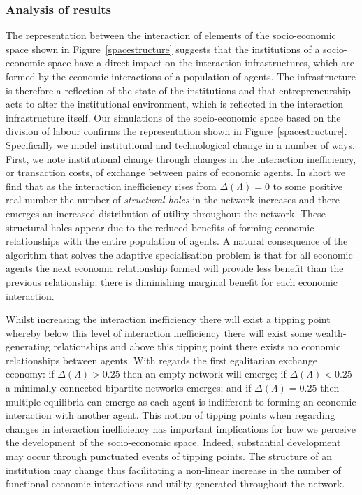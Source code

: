 \subsubsection{Analysis of results}
\label{sub:analysis_of_results}

The representation between the interaction of elements of the socio-economic space shown in Figure~\ref{spacestructure} suggests that the institutions of a socio-economic space have a direct impact on the interaction infrastructures, which are formed by the economic interactions of a population of agents. The infrastructure is therefore a reflection of the state of the institutions and that entrepreneurship acts to alter the institutional environment, which is reflected in the interaction infrastructure itself. Our simulations of the socio-economic space based on the division of labour confirms the representation shown in Figure~\ref{spacestructure}. Specifically we model institutional and technological change in a number of ways. First, we note institutional change through changes in the interaction inefficiency, or transaction costs, of exchange between pairs of economic agents. In short we find that as the interaction inefficiency rises from $\Delta(\Lambda) = 0$ to some positive real number the number of \emph{structural holes} in the network increases and there emerges an increased distribution of utility throughout the network. These structural holes appear due to the reduced benefits of forming economic relationships with the entire population of agents. A natural consequence of the algorithm that solves the adaptive specialisation problem is that for all economic agents the next economic relationship formed will provide less benefit than the previous relationship: there is diminishing marginal benefit for each economic interaction. 

Whilst increasing the interaction inefficiency there will exist a tipping point whereby below this level of interaction inefficiency there will exist some wealth-generating relationships and above this tipping point there exists no economic relationships between agents. With regards the first egalitarian exchange economy: if $\Delta(\Lambda) > 0.25$ then an empty network will emerge; if $\Delta(\Lambda) < 0.25$ a minimally connected bipartite networks emerges; and if $\Delta(\Lambda) = 0.25$ then multiple equilibria can emerge as each agent is indifferent to forming an economic interaction with another agent. This notion of tipping points when regarding changes in interaction inefficiency has important implications for how we perceive the development of the socio-economic space. Indeed, substantial development may occur through punctuated events of tipping points. The structure of an institution may change thus facilitating a non-linear increase in the number of functional economic interactions and utility generated throughout the network.

